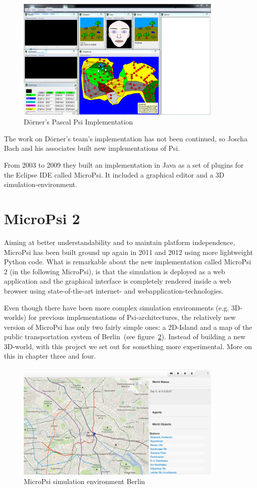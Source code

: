 \begin{figure}[h]
  \centering
    \includegraphics[width=10cm]{graphics/psi_screen1}
  \caption{Dörner's Pascal Psi Implementation}
  \label{psi_screen}
\end{figure}

The work on Dörner's team's implementation has not been continued, so Joscha Bach and his associates built new implementations of Psi.

From 2003 to 2009 they built an implementation in Java as a set of plugins for the Eclipse IDE called MicroPsi. It included a graphical editor and a 3D simulation-environment. 

    \section{MicroPsi 2}
Aiming at better understandability and to maintain platform independence, MicroPsi has been built ground up again in 2011 and 2012 using more lightweight Python code. What is remarkable about the new implementation called MicroPsi 2 (in the following MicroPsi), is that the simulation is deployed as a web application and the graphical interface is completely rendered inside a web browser using state-of-the-art internet- and webapplication-technologies.~\cite{conf/agi/Bach12}
        
Even though there have been more complex simulation environments (e.g. 3D-worlds) for previous implementations of Psi-architectures, the relatively new version of MicroPsi has only two fairly simple ones: a 2D-Island and a map of the public transportation system of Berlin~(see figure~\ref{mp2_berlin}). Instead of building a new 3D-world, with this project we set out for something more experimental. More on this in chapter three and four.

\begin{figure}[h]
  \centering
    \includegraphics[width=10cm]{graphics/mp2_berlin}
  \caption{MicroPsi simulation environment Berlin}
  \label{mp2_berlin}
\end{figure}

